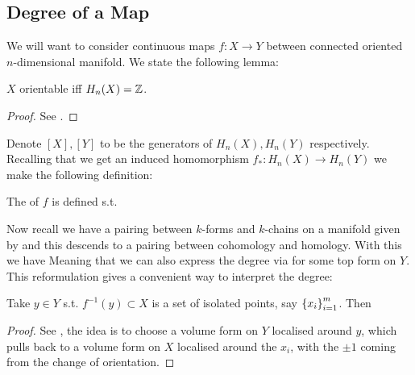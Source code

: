 \documentclass{article}
\begin{document}
\subsection{Degree of a Map}
We will want to consider continuous maps $f:X \to Y$ between connected oriented $n$-dimensional manifold. We state the following lemma:
\begin{lemma}
	$X$ orientable iff $H_n(X) = \mathbb{Z}$. 
\end{lemma}
\begin{proof}
	See \cite{Hatcher2002}.
\end{proof}
Denote $[X], [Y]$ to be the generators of $H_n(X), H_n(Y)$ respectively. Recalling that we get an induced homomorphism $f_\ast : H_n(X) \to H_n(Y)$ we make the following definition:
\begin{definition}
	The  of $f$ is defined s.t. 
\end{definition}
Now recall we have a pairing between $k$-forms and $k$-chains on a manifold given by 
and this descends to a pairing between cohomology and homology. With this we have 
Meaning that we can also express the degree via 
for some top form on $Y$. This reformulation gives a convenient way to interpret the degree:
\begin{prop}
	Take $y \in Y$ s.t. $f^{-1}(y) \subset X$ is a set of isolated points, say $\left\{ x_i \right\}_{i=1}^m$. Then 
\end{prop}
\begin{proof}
	See \cite{Manton2004}, the idea is to choose a volume form on $Y$ localised around $y$, which pulls back to a volume form on $X$ localised around the $x_i$, with the $\pm1$ coming from the change of orientation. 
\end{proof}
\end{document}
